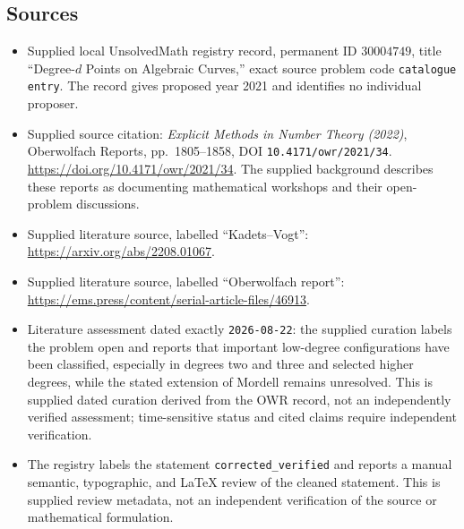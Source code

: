 \documentclass[11pt]{article}
\begin{document}
\subsection{Sources}
\begin{itemize}
\item Supplied local UnsolvedMath registry record, permanent ID \(30004749\), title ``Degree-\(d\) Points on Algebraic Curves,'' exact source problem code \texttt{catalogue entry}. The record gives proposed year 2021 and identifies no individual proposer.
\item Supplied source citation: \emph{Explicit Methods in Number Theory (2022)}, Oberwolfach Reports, pp.\ 1805--1858, DOI \texttt{10.4171/owr/2021/34}. \url{https://doi.org/10.4171/owr/2021/34}. The supplied background describes these reports as documenting mathematical workshops and their open-problem discussions.
\item Supplied literature source, labelled ``Kadets--Vogt'': \url{https://arxiv.org/abs/2208.01067}.
\item Supplied literature source, labelled ``Oberwolfach report'': \url{https://ems.press/content/serial-article-files/46913}.
\item Literature assessment dated exactly \texttt{2026-08-22}: the supplied curation labels the problem open and reports that important low-degree configurations have been classified, especially in degrees two and three and selected higher degrees, while the stated extension of Mordell remains unresolved. This is supplied dated curation derived from the OWR record, not an independently verified assessment; time-sensitive status and cited claims require independent verification.
\item The registry labels the statement \texttt{corrected\_verified} and reports a manual semantic, typographic, and LaTeX review of the cleaned statement. This is supplied review metadata, not an independent verification of the source or mathematical formulation.
\end{itemize}
\end{document}
